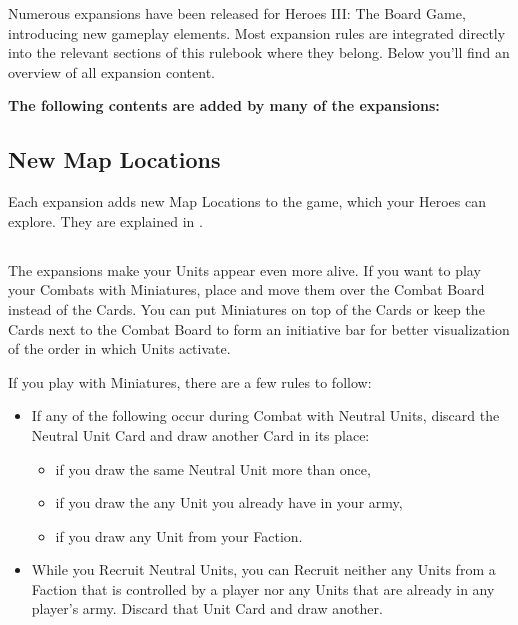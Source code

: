 
Numerous expansions have been released for Heroes III: The Board Game, introducing new gameplay elements.
Most expansion rules are integrated directly into the relevant sections of this rulebook where they belong.
Below you'll find an overview of all expansion content.

\vspace*{1em}

\textbf{The following contents are added by many of the expansions:}
\begin{multicols*}{2}
\subsection*{New Map Locations}
Each expansion adds new Map Locations to the game, which your Heroes can explore.
They are explained in .

\subsection*{}
The expansions make your Units appear even more alive.
If you want to play your Combats with Miniatures, place and move them over the Combat Board instead of the Cards.
You can put Miniatures on top of the Cards or keep the Cards next to the Combat Board to form an initiative bar for better visualization of the order in which Units activate.\par
\vspace*{1em}
If you play with Miniatures, there are a few rules to follow:
\begin{itemize}
  \item If any of the following occur during Combat with Neutral Units, discard the Neutral Unit Card and draw another Card in its place:
    \begin{itemize}
      \item if you draw the same Neutral Unit more than once,
      \item if you draw the any Unit you already have in your army,
      \item if you draw any Unit from your Faction.
    \end{itemize}
  \item While you Recruit Neutral Units, you can Recruit neither any Units from a Faction that is controlled by a player nor any Units that are already in any player's army.
  Discard that Unit Card and draw another.
\end{itemize}


\end{multicols*}
